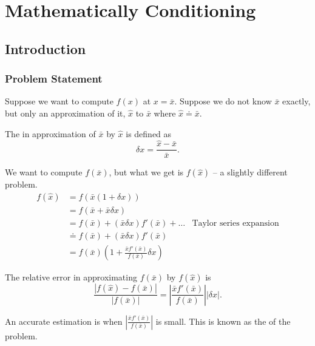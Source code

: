 \chapter{Mathematically Conditioning}

\section{Introduction}

\subsection{Problem Statement}

Suppose we want to compute \( f(x) \) at \( x = \bar{x} \). Suppose we do not know \( \bar{x} \) exactly, but only an approximation of it, \( \hat{x} \) to \( \bar{x} \) where \( \hat{x} \doteq \bar{x} \).

\begin{definition}
    The  in approximation of \( \bar{x} \) by \( \hat{x} \) is defined as \[
        \delta x = \frac{\hat{x} - \bar{x}}{\bar{x}}.
    \]
\end{definition}

We want to compute \( f(\bar{x}) \), but what we get is \( f(\hat{x}) \) -- a slightly different problem. \begin{align*}
    f(\hat{x})
     & = f(\bar{x}(1 + \delta x))                                                      \\
     & = f(\bar{x} + \bar{x} \delta x)                                                 \\
     & = f(\bar{x}) + (\bar{x} \delta x) f'(\bar{x}) + \dots
     & \text{Taylor series expansion}                                                  \\
     & \doteq f(\bar{x}) + (\bar{x} \delta x) f'(\bar{x})                              \\
     & = f(\bar{x}) \left( 1 + \frac{\bar{x} f'(\bar{x})}{f(\bar{x})} \delta x \right)
\end{align*}

The relative error in approximating \( f(\bar{x}) \) by \( f(\hat{x}) \) is \[
    \frac{|f(\hat{x}) - f(\bar{x})|}{|f(\bar{x})|} = \left| \frac{\bar{x} f'(\bar{x})}{f(\bar{x})} \right| | \delta x |.
\]

An accurate estimation is when \( \left| \frac{\bar{x} f'(\bar{x})}{f(\bar{x})} \right| \) is small. This is known as the  of the problem.

